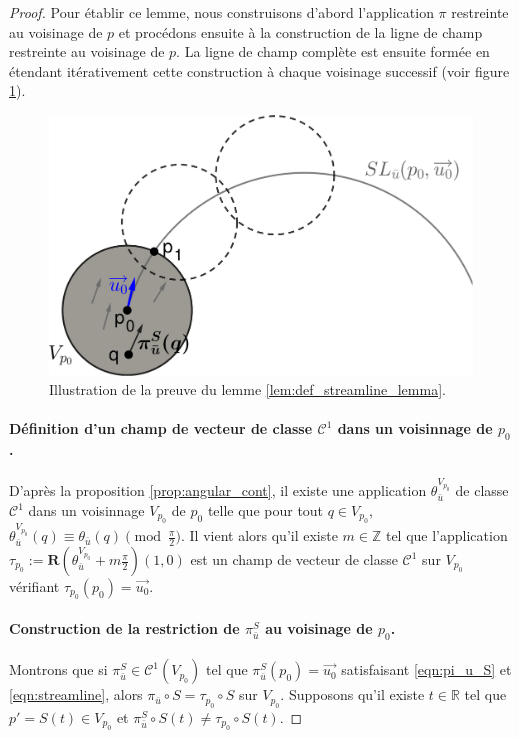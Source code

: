 \begin{proof}
Pour établir ce lemme, nous construisons d'abord l'application $\pi$ restreinte au voisinage de $p$ et procédons ensuite à la construction de la ligne de champ restreinte au voisinage de $p$. La ligne de champ complète est ensuite formée en étendant itérativement cette construction à chaque voisinage successif (voir figure \ref{fig:streamline_construction}).\
\begin{figure}[!h]
\centering
\includegraphics[scale=0.45]{images/streamline_construction.pdf}
\caption{Illustration de la preuve du lemme \ref{lem:def_streamline_lemma}.}
\label{fig:streamline_construction}
\end{figure}

\paragraph{Définition d'un champ de vecteur de classe $\mathcal{C}^1$ dans un voisinnage de $p_0$.} D'après la proposition \ref{prop:angular_cont}, il existe une application $\theta_{\bar{u}}^{V_{p_0}}$ de classe $\mathcal{C}^1$ dans un voisinnage $V_{p_0}$ de $p_0$ telle que pour tout $q\in V_{p_0}$, $\theta_{\bar{u}}^{V_{p_0}}(q)\equiv\theta_{\bar{u}}(q)\pmod{\frac{\pi}{2}}$. Il vient alors qu'il existe $m\in\mathbb{Z}$ tel que l'application $\tau_{p_0}:=\mathbf{R}(\theta_{\bar{u}}^{V_{p_0}}+m\frac{\pi}{2})(1, 0)$ est un champ de vecteur de classe $\mathcal{C}^1$ sur $V_{p_0}$ vérifiant $\tau_{p_0}(p_0)=\overrightarrow{u_0}$.

\paragraph{Construction de la restriction de $\pi_{\bar{u}}^S$ au voisinage de $p_0$.}
Montrons que si $\pi_{\bar{u}}^S\in\mathcal{C}^1(V_{p_0})$ tel que $\pi_{\bar{u}}^S(p_0)=\overrightarrow{u_0}$ satisfaisant \eqref{eqn:pi_u_S} et \eqref{eqn:streamline}, alors $\pi_{\bar{u}}\circ S=\tau_{p_0}\circ S$ sur $V_{p_0}$. Supposons qu'il existe $t\in\mathbb{R}$ tel que $p'=S(t)\in V_{p_0}$ et $\pi_{\bar{u}}^S\circ S(t)\neq\tau_{p_0}\circ S(t)$.


\end{proof}
